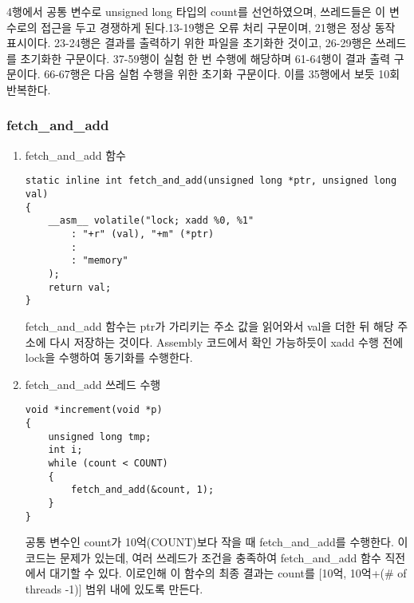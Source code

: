 \documentclass[11pt, a4paper]{article}
\begin{document}
4행에서 공통 변수로 unsigned long 타입의 count를 선언하였으며, 쓰레드들은 이 변수로의 접근을 두고 경쟁하게 된다.13-19행은 오류 처리 구문이며, 21행은 정상 동작 표시이다. 23-24행은 결과를 출력하기 위한 파일을 초기화한 것이고, 26-29행은 쓰레드를 초기화한 구문이다. 37-59행이 실험 한 번 수행에 해당하며 61-64행이 결과 출력 구문이다. 66-67행은 다음 실험 수행을 위한 초기화 구문이다. 이를 35행에서 보듯 10회 반복한다. 

\subsubsection{fetch\_and\_add}

\begin{enumerate}
\item fetch\_and\_add 함수

\begin{lstlisting}
static inline int fetch_and_add(unsigned long *ptr, unsigned long val)
{
	__asm__ volatile("lock; xadd %0, %1"
		: "+r" (val), "+m" (*ptr)
		:
		: "memory"
	);
	return val;
}
\end{lstlisting}

fetch\_and\_add 함수는 ptr가 가리키는 주소 값을 읽어와서 val을 더한 뒤 해당 주소에 다시 저장하는 것이다. Assembly 코드에서 확인 가능하듯이 xadd 수행 전에 lock을 수행하여 동기화를 수행한다.

\item fetch\_and\_add 쓰레드 수행
\begin{lstlisting}
void *increment(void *p)
{
	unsigned long tmp;
	int i;
	while (count < COUNT)
	{
		fetch_and_add(&count, 1);
	}
}
\end{lstlisting}

공통 변수인 count가 10억(COUNT)보다 작을 때 fetch\_and\_add를 수행한다. 이 코드는 문제가 있는데, 여러 쓰레드가 조건을 충족하여 fetch\_and\_add 함수 직전에서 대기할 수 있다. 이로인해 이 함수의 최종 결과는 count를 [10억, 10억+(\# of threads -1)] 범위 내에 있도록 만든다.

\end{enumerate}
\end{document}
